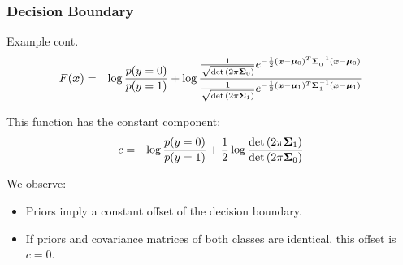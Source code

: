 \begin{frame}
  \frametitle{Decision Boundary \cont}

  \begin{ovalblock}{Example cont.}
    \footnotesize
    \begin{eqnarray*}
      F({\bm x}) &=&
        \log\frac{p(y=0)}{p(y=1)} +
        \log
        \frac{
          \frac{1}{ \sqrt{ \det{( 2 \pi \ensuremath{{\bm \Sigma}}_0)}} }
          e^{ -\frac{1}{2} ({\bm x} - {\bm \mu}_0)^T {\bm \Sigma}_0^{-1} ({\bm x} - {\bm \mu}_0) }         
        }{
          \frac{1}{ \sqrt{ \det{(2 \pi \ensuremath{{\bm \Sigma}}_1)}} }
          e^{ -\frac{1}{2} ({\bm x} - {\bm \mu}_1)^T {\bm \Sigma}_1^{-1} ({\bm x} - {\bm \mu}_1)}
        }
    \end{eqnarray*}
    \pause
 
    This function has the constant component:
% 
    \begin{eqnarray*}
      c &=& \log \frac{p(y=0)}{p(y=1)}+\frac{1}{2}
            \log \frac{ { \det{(2\pi\ensuremath{{\bm \Sigma}}_1)}}}
                      { { \det{(2\pi\ensuremath{{\bm \Sigma}}_0)}}}
    \end{eqnarray*}
    \pause 
    
    We observe:
    \begin{itemize}
      \small
      \item Priors imply a constant offset of the decision boundary. 
      \item If priors and covariance matrices of both classes are identical, this offset is $c=0$.
    \end{itemize}
  \end{ovalblock}
\end{frame}


